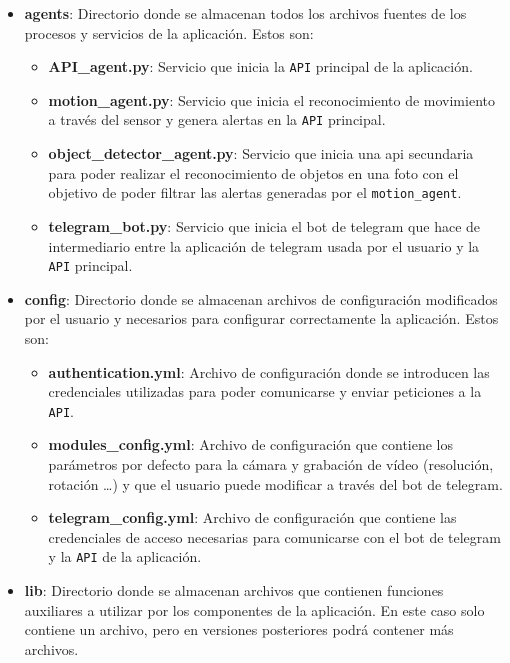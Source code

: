 \vspace{-0.5cm}

\begin{itemize}
\item \textbf{agents}: Directorio donde se almacenan todos los archivos fuentes de los procesos y servicios de la aplicación. Estos son:

	\begin{itemize}
	\item \textbf{API\_agent.py}: Servicio que inicia la \texttt{API} principal de la aplicación.
	\item \textbf{motion\_agent.py}: Servicio que inicia el reconocimiento de movimiento a través del sensor y genera alertas en la \texttt{API} principal.
	\item \textbf{object\_detector\_agent.py}: Servicio que inicia una api secundaria para poder realizar el reconocimiento de objetos en una foto con el objetivo de poder filtrar las alertas generadas por el \texttt{motion\_agent}.
	\item \textbf{telegram\_bot.py}: Servicio que inicia el bot de telegram que hace de intermediario entre la aplicación de telegram usada por el usuario y la \texttt{API} principal.
	\end{itemize}

\item \textbf{config}: Directorio donde se almacenan archivos de configuración modificados por el usuario y necesarios para configurar correctamente la aplicación. Estos son:

	\begin{itemize}
	\item \textbf{authentication.yml}: Archivo de configuración donde se introducen las credenciales utilizadas para poder comunicarse y enviar peticiones a la \texttt{API}.
	\item \textbf{modules\_config.yml}: Archivo de configuración que contiene los parámetros por defecto para la cámara y grabación de vídeo (resolución, rotación \ldots) y que el usuario puede modificar a través del bot de telegram.
	\item \textbf{telegram\_config.yml}: Archivo de configuración que contiene las credenciales de acceso necesarias para comunicarse con el bot de telegram y la \texttt{API} de la aplicación.
	\end{itemize}

\item \textbf{lib}: Directorio donde se almacenan archivos que contienen funciones auxiliares a utilizar por los componentes de la aplicación. En este caso solo contiene un archivo, pero en versiones posteriores podrá contener más archivos.


\end{itemize}
